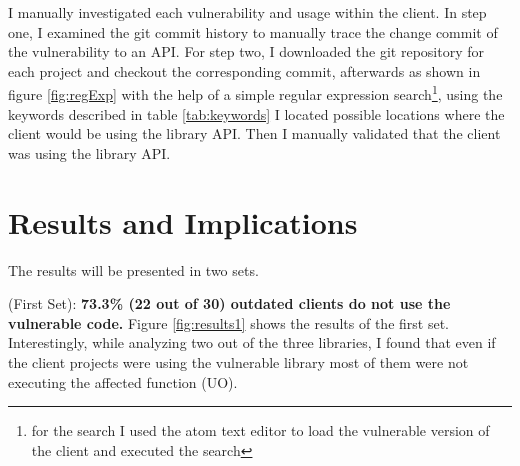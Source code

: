 I manually investigated each vulnerability and usage within the client.
In step one, I examined the git commit history to manually trace the change commit of the vulnerability to an API.
For step two, I downloaded the git repository for each project and checkout the corresponding commit, afterwards as shown in figure \ref{fig:regExp} with the help of a simple regular expression search\footnote{for the search I used the atom text editor to load the vulnerable version of the client and executed the search}, using the keywords described in table \ref{tab:keywords} I located possible locations where the client would be using the library API. 
Then I manually validated that the client was using the library API.

\begin{table}[ht]
\centering
\hspace*{-0.3cm}
\caption{Summary of the Keywords Used in the Validation Mapping}
\label{tab:keywords}
\end{table}

\section{Results and Implications}
The results will be presented in two sets.

(First Set): \textbf{73.3\% (22 out of 30) outdated clients do not use the vulnerable code.} 
Figure \ref{fig:results1} shows the results of the first set.
Interestingly, while analyzing two out of the three libraries, I found that even if the client projects were using the vulnerable library most of them were not executing the affected function (UO).

